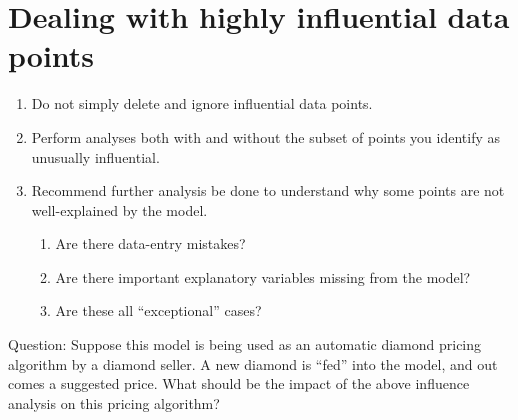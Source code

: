 \documentclass[
]{book}
\providecommand{\tightlist}{%
  \setlength{\itemsep}{0pt}\setlength{\parskip}{0pt}}
\begin{document}
\hypertarget{dealing-with-highly-influential-data-points}{%
\section{Dealing with highly influential data points}\label{dealing-with-highly-influential-data-points}}

\begin{enumerate}
\def\labelenumi{\arabic{enumi}.}
\tightlist
\item
  Do not simply delete and ignore influential data points.
\item
  Perform analyses both with and without the subset of points you identify as unusually influential.
\item
  Recommend further analysis be done to understand why some points are not well-explained by the model.

  \begin{enumerate}
  \def\labelenumii{\alph{enumii}.}
  \tightlist
  \item
    Are there data-entry mistakes?
  \item
    Are there important explanatory variables missing from the model?
  \item
    Are these all ``exceptional'' cases?
  \end{enumerate}
\end{enumerate}

Question: Suppose this model is being used as an automatic diamond pricing algorithm by a diamond seller. A new diamond is ``fed'' into the model, and out comes a suggested price. What should be the impact of the above influence analysis on this pricing algorithm?

  
\end{document}
